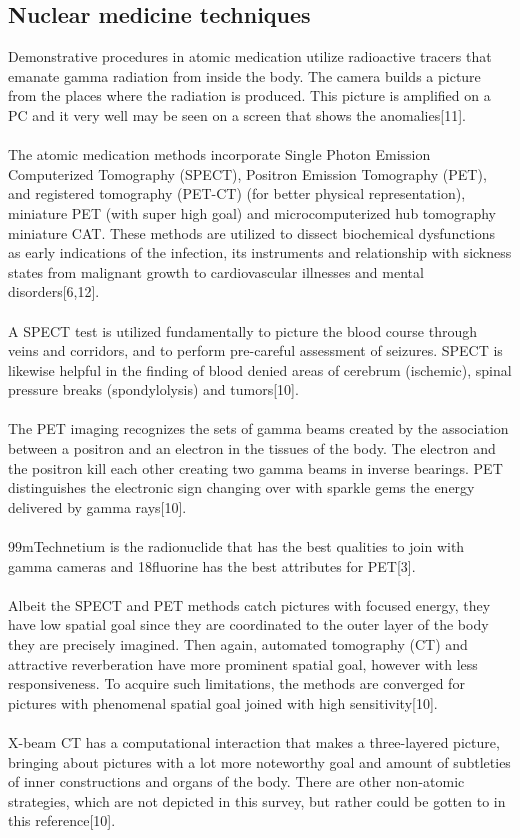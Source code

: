 \documentclass[12pt]{article}
\begin{document}
\subsection{Nuclear medicine techniques}
Demonstrative procedures in atomic medication utilize radioactive tracers that emanate gamma radiation from inside the body. The camera builds a picture from the places where the radiation is produced. This picture is amplified on a PC and it very well may be seen on a screen that shows the anomalies[11].
\\
\\
The atomic medication methods incorporate Single Photon Emission Computerized Tomography (SPECT), Positron Emission Tomography (PET), and registered tomography (PET-CT) (for better physical representation), miniature PET (with super high goal) and microcomputerized hub tomography miniature CAT. These methods are utilized to dissect biochemical dysfunctions as early indications of the infection, its instruments and relationship with sickness states from malignant growth to cardiovascular illnesses and mental disorders[6,12].
\\
\\
A SPECT test is utilized fundamentally to picture the blood course through veins and corridors, and to perform pre-careful assessment of seizures. SPECT is likewise helpful in the finding of blood denied areas of cerebrum (ischemic), spinal pressure breaks (spondylolysis) and tumors[10].
\\
\\
The PET imaging recognizes the sets of gamma beams created by the association between a positron and an electron in the tissues of the body. The electron and the positron kill each other creating two gamma beams in inverse bearings. PET distinguishes the electronic sign changing over with sparkle gems the energy delivered by gamma rays[10].
\\
\\
99mTechnetium is the radionuclide that has the best qualities to join with gamma cameras and 18fluorine has the best attributes for PET[3].
\\
\\
Albeit the SPECT and PET methods catch pictures with focused energy, they have low spatial goal since they are coordinated to the outer layer of the body they are precisely imagined. Then again, automated tomography (CT) and attractive reverberation have more prominent spatial goal, however with less responsiveness. To acquire such limitations, the methods are converged for pictures with phenomenal spatial goal joined with high sensitivity[10].
\\
\\
X-beam CT has a computational interaction that makes a three-layered picture, bringing about pictures with a lot more noteworthy goal and amount of subtleties of inner constructions and organs of the body. There are other non-atomic strategies, which are not depicted in this survey, but rather could be gotten to in this reference[10].
\end{document}
